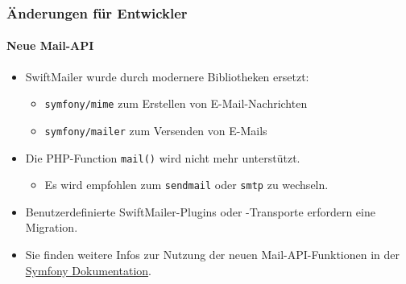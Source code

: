 
\begin{frame}[fragile]
	\frametitle{Änderungen für Entwickler}
	\framesubtitle{Neue Mail-API}

	\begin{itemize}
		\item SwiftMailer wurde durch modernere Bibliotheken ersetzt:

			\begin{itemize}
				\item \texttt{symfony/mime} zum Erstellen von E-Mail-Nachrichten
				\item \texttt{symfony/mailer} zum Versenden von E-Mails
			\end{itemize}

		\item Die PHP-Function \texttt{mail()} wird nicht mehr unterstützt.

			\begin{itemize}\smaller
				\item[\ding{228}] Es wird empfohlen zum \texttt{sendmail} oder \texttt{smtp} zu wechseln.
			\end{itemize}\normalsize

		\item Benutzerdefinierte SwiftMailer-Plugins oder -Transporte erfordern eine Migration.

		\item Sie finden weitere Infos zur Nutzung der neuen Mail-API-Funktionen in der \href{https://symfony.com/doc/current/mailer.html}{Symfony Dokumentation}.
	\end{itemize}

\end{frame}



